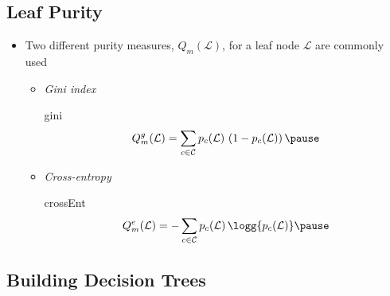 
\begin{slide}
\section{Leaf Purity}

\begin{PauseHighLight}
  \begin{itemize}
  \item Two different purity measures, $Q_m(\mathcal{L})$, for a leaf node
    $\mathcal{L}$ are commonly used\pause
    \begin{itemize}
    \item \emph{Gini index}
      \begin{rightImage}{gini}
        \begin{align*}
          Q^g_m(\mathcal{L}) = \sum_{c\in\mathcal{C}} p_{c}(\mathcal{L})\,
          \left(1-p_{c}(\mathcal{L})\right)\pause
        \end{align*}
      \end{rightImage}
    \item \emph{Cross-entropy}
      \begin{rightImage}{crossEnt}
        \begin{align*}
          Q^e_m(\mathcal{L}) = - \sum_{c\in\mathcal{C}} p_{c}(\mathcal{L})\,
          \logg{p_{c}(\mathcal{L})} \pause        
        \end{align*}
      \end{rightImage}
    \end{itemize}
  \end{itemize}
\end{PauseHighLight}

\end{slide}



\begin{slide}
\section[-1]{Building Decision Trees}

\pb\pause{}
\begin{center}
  \pause
\end{center}

\end{slide}

